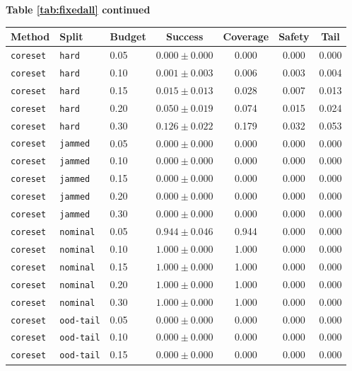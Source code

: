 \documentclass{article}
\begin{document}
\begin{center}
\textbf{Table \ref{tab:fixedall} continued}\\[0.4ex]
\begin{tabular}{lllcccc}
\toprule
Method & Split & Budget & Success & Coverage & Safety & Tail \\
\midrule
\texttt{coreset} & \texttt{hard} & 0.05 & $0.000 \pm 0.000$ & 0.000 & 0.000 & 0.000 \\
\texttt{coreset} & \texttt{hard} & 0.10 & $0.001 \pm 0.003$ & 0.006 & 0.003 & 0.004 \\
\texttt{coreset} & \texttt{hard} & 0.15 & $0.015 \pm 0.013$ & 0.028 & 0.007 & 0.013 \\
\texttt{coreset} & \texttt{hard} & 0.20 & $0.050 \pm 0.019$ & 0.074 & 0.015 & 0.024 \\
\texttt{coreset} & \texttt{hard} & 0.30 & $0.126 \pm 0.022$ & 0.179 & 0.032 & 0.053 \\
\texttt{coreset} & \texttt{jammed} & 0.05 & $0.000 \pm 0.000$ & 0.000 & 0.000 & 0.000 \\
\texttt{coreset} & \texttt{jammed} & 0.10 & $0.000 \pm 0.000$ & 0.000 & 0.000 & 0.000 \\
\texttt{coreset} & \texttt{jammed} & 0.15 & $0.000 \pm 0.000$ & 0.000 & 0.000 & 0.000 \\
\texttt{coreset} & \texttt{jammed} & 0.20 & $0.000 \pm 0.000$ & 0.000 & 0.000 & 0.000 \\
\texttt{coreset} & \texttt{jammed} & 0.30 & $0.000 \pm 0.000$ & 0.000 & 0.000 & 0.000 \\
\texttt{coreset} & \texttt{nominal} & 0.05 & $0.944 \pm 0.046$ & 0.944 & 0.000 & 0.000 \\
\texttt{coreset} & \texttt{nominal} & 0.10 & $1.000 \pm 0.000$ & 1.000 & 0.000 & 0.000 \\
\texttt{coreset} & \texttt{nominal} & 0.15 & $1.000 \pm 0.000$ & 1.000 & 0.000 & 0.000 \\
\texttt{coreset} & \texttt{nominal} & 0.20 & $1.000 \pm 0.000$ & 1.000 & 0.000 & 0.000 \\
\texttt{coreset} & \texttt{nominal} & 0.30 & $1.000 \pm 0.000$ & 1.000 & 0.000 & 0.000 \\
\texttt{coreset} & \texttt{ood-tail} & 0.05 & $0.000 \pm 0.000$ & 0.000 & 0.000 & 0.000 \\
\texttt{coreset} & \texttt{ood-tail} & 0.10 & $0.000 \pm 0.000$ & 0.000 & 0.000 & 0.000 \\
\texttt{coreset} & \texttt{ood-tail} & 0.15 & $0.000 \pm 0.000$ & 0.000 & 0.000 & 0.000 \\

\end{tabular}
\end{center}
\end{document}
